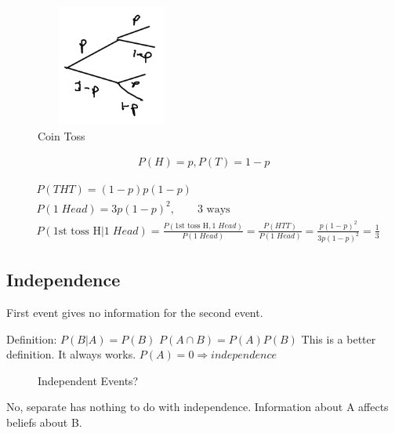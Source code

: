 \begin{figure}[!ht]
\centering
\includegraphics[width=5cm, height=4cm]{images/L03/coin_toss3.jpeg}
\caption{Coin Toss}
\end{figure}


\begin{align*}
P(H)=p, P(T)=1-p
\end{align*}

\begin{align*}
&P(THT)=(1-p)p(1-p)\\
&P(1\;Head)=3p(1-p)^2, \qquad \text{3 ways}\\
&P(\text{1st toss H}|1\;Head)=\frac{P(\text{1st toss H},1\;Head)}{P(1\;Head)}=\frac{P(HTT)}{P(1\;Head)}=\frac{p(1-p)^2}{3p(1-p)^2}=\frac{1}{3}
\end{align*}
% 

\subsection{Independence}


First event gives no information for the second event.

Definition: $P(B|A)=P(B)$
$P(A \cap B)=P(A)P(B)$ This is a better definition.  It always works.
$P(A)=0 \Rightarrow independence$

\begin{figure}[ht]
\centering
{}
\caption{Independent Events?} \label{fig:M22}
\end{figure}


No, separate has nothing to do with independence.  Information about A affects beliefs about B.

